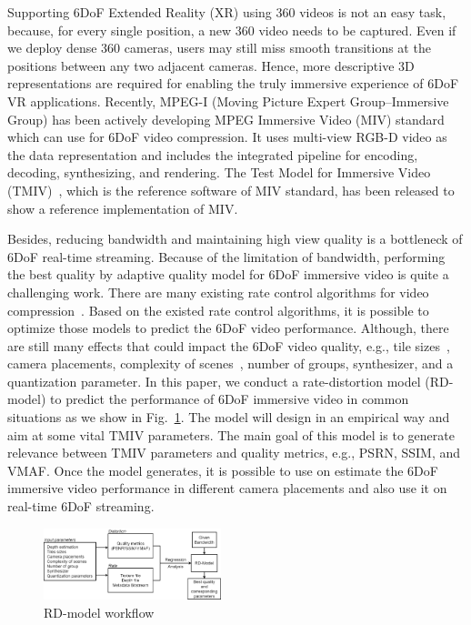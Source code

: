 Supporting 6DoF Extended Reality (XR) using 360{\degree} videos is not an easy task, because, for every single position, a new 360{\degree} video needs to be captured.
Even if we deploy dense 360{\degree} cameras, users may still miss smooth transitions at the positions between any two adjacent cameras.
Hence, more descriptive 3D representations are required for enabling the truly immersive experience of 6DoF VR applications.
Recently, MPEG-I (Moving Picture Expert Group--Immersive Group) has been actively developing MPEG Immersive Video (MIV) standard~\cite{BDDF+21, MPEG_MIV_web} which can use for 6DoF video compression.
It uses multi-view RGB-D video as the data representation and includes the integrated pipeline for encoding, decoding, synthesizing, and rendering.
The Test Model for Immersive Video (TMIV)~\cite{tmiv_doc,tmiv_gitlab}, which is the reference software of MIV standard, has been released to show a reference implementation of MIV.

Besides, reducing bandwidth and maintaining high view quality is a bottleneck of 6DoF real-time streaming.
Because of the limitation of bandwidth, performing the best quality by adaptive quality model for 6DoF immersive video is quite a challenging work.
There are many existing rate control algorithms for video compression~\cite{PZAB16}\cite{WYTC12}\cite{HM01}.
Based on the existed rate control algorithms, it is possible to optimize those models to predict the 6DoF video performance.
Although, there are still many effects that could impact the 6DoF video quality, e.g., tile sizes~\cite{JLLR20}, camera placements, complexity of scenes~\cite{BWJ21}, number of groups, synthesizer, and a quantization parameter.
In this paper, we conduct a rate-distortion model (RD-model) to predict the performance of 6DoF immersive video in common situations as we show in Fig.~\ref{fig:RD_model_concept}.
The model will design in an empirical way and aim at some vital TMIV parameters.
The main goal of this model is to generate relevance between TMIV parameters and quality metrics, e.g., PSRN, SSIM, and VMAF.
Once the model generates, it is possible to use on estimate the 6DoF immersive video performance in different camera placements and also use it on real-time 6DoF streaming.

\begin{figure}[tbh]
    \centering
    \includegraphics[width=0.46\textwidth]{figs/RD_model_concept}
    \caption{RD-model workflow}
    \label{fig:RD_model_concept}
\end{figure}

